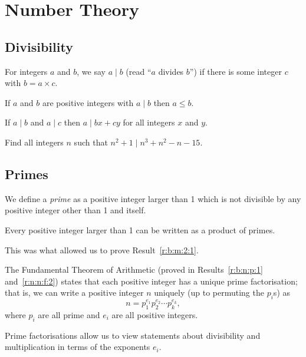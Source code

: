 \section{Number Theory}
\subsection{Divisibility}
  For integers $a$ and $b$, we say $a\mid b$ (read ``$a$ divides
  $b$'') if there is some integer $c$ with $b=a\times c$.
\begin{result}{\label{r:b:n:d:1}}
    If $a$ and $b$ are positive integers with $a\mid b$ then
      $a\le b$.
\end{result}
\begin{result}{\label{r:b:n:d:2}}
    If $a\mid b$ and $a\mid c$ then $a\mid bx+cy$ for all
      integers $x$ and $y$.
\end{result}
\begin{problem}{\label{p:b:n:d:1}}
    Find all integers $n$ such that $n^2+1\mid n^3+n^2-n-15$.
\end{problem}
\subsection{Primes}
  We define a \emph{prime} as a positive integer larger than 1 which is not
  divisible by any positive integer other than 1 and itself.
\begin{result}{\label{r:b:n:p:1}}
  Every positive integer larger than 1 can be written as a product of primes.
\end{result}
This was what allowed us to prove Result~\ref{r:b:m:2:1}.

The Fundamental Theorem of Arithmetic (proved in Results~\ref{r:b:n:p:1}
and~\ref{r:n:n:f:2})
states that each positive integer has a unique prime factorisation; that is,
we can write a positive integer $n$ uniquely (up to permuting the $p_i$s) as
\[n=p_1^{e_1}p_2^{e_2}\cdots p_k^{e_k},\]
where $p_i$ are all prime and $e_i$ are all positive integers.

Prime factorisations allow us to view statements about divisibility and
multiplication in terms of the exponents $e_i$.

